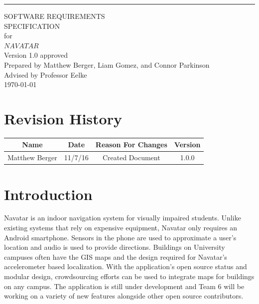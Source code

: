 \documentclass{scrreprt}
\date{}
\def\myversion{1.0 }
\begin{document}
\begin{flushright}
    \rule{16cm}{5pt}\vskip1cm
    \begin{bfseries}
        \Huge{SOFTWARE REQUIREMENTS\\ SPECIFICATION}\\
        \vspace{1.6cm}
        for\\
        \vspace{1.6cm}
        $NAVATAR$\\
        \vspace{1.6cm}
        \LARGE{Version \myversion approved}\\
        \vspace{1.6cm}
        Prepared by Matthew Berger, Liam Gomez, and Connor Parkinson\\ 
        \vspace{1.6cm}
        Advised by Professor Eelke\\
        \vspace{1.6cm}
        \today\\
    \end{bfseries}
\end{flushright}

{\small\tableofcontents}

\chapter*{Revision History}

\begin{center}
    \begin{tabular}{|c|c|c|c|}
        \hline
	    Name & Date & Reason For Changes & Version\\
        \hline
	    Matthew Berger & 11/7/16 & Created Document & 1.0.0\\
        \hline
    \end{tabular}
\end{center}

\chapter{Introduction}

Navatar is an indoor navigation system for visually impaired students. Unlike existing
systems that rely on expensive equipment, Navatar only requires an Android smartphone.
Sensors in the phone are used to approximate a user's location and audio is used to provide
directions. Buildings on University campuses often have the GIS maps and the design required
for Navatar’s accelerometer based localization. With the application’s open source status and
modular design, crowdsourcing efforts can be used to integrate maps for buildings on any
campus. The application is still under development and Team 6 will be working on a variety of
new features alongside other open source contributors.\\
\end{document}
